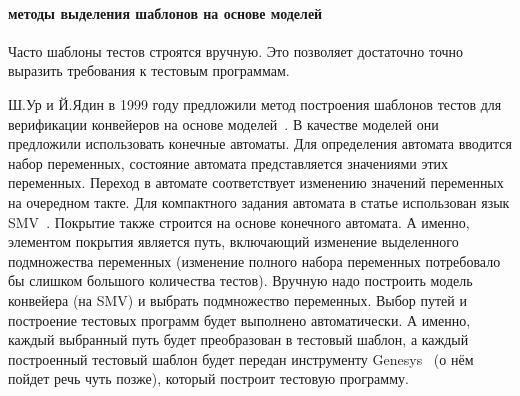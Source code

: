 \documentclass[14pt]{extreport}
\begin{document}
\paragraph{методы выделения шаблонов на основе моделей}

Часто шаблоны тестов строятся вручную. Это позволяет достаточно точно выразить требования к тестовым программам.

Ш.Ур и Й.Ядин в 1999 году предложили метод построения шаблонов тестов для верификации конвейеров на основе моделей~\cite{UrFSM}. В качестве моделей они предложили использовать конечные автоматы. Для определения автомата вводится набор переменных, состояние автомата представляется значениями этих переменных. Переход в автомате соответствует изменению значений переменных на очередном такте. Для компактного задания автомата в статье использован язык SMV~\cite{SMV}. Покрытие также строится на основе конечного автомата. А именно, элементом покрытия является путь, включающий изменение выделенного подмножества переменных (изменение полного набора переменных потребовало бы слишком большого количества тестов). Вручную надо построить модель конвейера (на SMV) и выбрать подмножество переменных. Выбор путей и построение тестовых программ будет выполнено автоматически. А именно, каждый выбранный путь будет преобразован в тестовый шаблон, а каждый построенный тестовый шаблон будет передан инструменту Genesys~\cite{Genesys} (о нём пойдет речь чуть позже), который построит тестовую программу.

\end{document}
